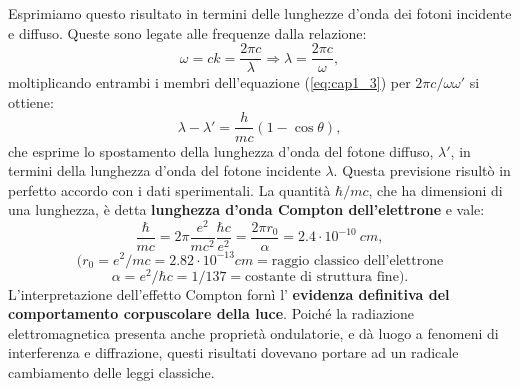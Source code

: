 \documentclass[a4paper,12pt,oneside]{book}
\begin{document}
Esprimiamo questo risultato in termini delle lunghezze d'onda dei fotoni incidente e diffuso. Queste sono legate alle frequenze dalla relazione:
\begin{equation}
\omega = c k =\frac{2 \pi c}{\lambda} \Rightarrow \lambda =\frac{2 \pi c}{\omega},
\end{equation}
moltiplicando entrambi i membri dell'equazione (\ref{eq:cap1_3}) per $2 \pi c / \omega \omega '$ si ottiene:
\begin{equation}
\lambda - \lambda ' =\frac{h}{mc}\left( 1-\cos \theta \right),
\end{equation}
che esprime lo spostamento della lunghezza d'onda del fotone diffuso, $\lambda ' $, in termini della lunghezza d'onda del fotone incidente $\lambda$. Questa previsione risultò in perfetto accordo con i dati sperimentali.
La quantità $\hbar/ mc$, che ha dimensioni di una lunghezza, è detta \textbf{lunghezza d'onda Compton dell'elettrone} e vale:
\[
\frac{\hbar}{mc}= 2\pi \frac{e^2}{mc^2}\frac{\hbar c}{e^2}= \frac{2\pi r_0}{\alpha}= 2.4 \cdot 10^{-10} \ cm,
\]
\[(r_0 = e^2/mc = 2.82 \cdot 10^{-13} cm = \textrm{raggio classico dell'elettrone}\]
\[\alpha = e^2/\hbar c = 1/137 = \textrm{costante di struttura fine}).\]
L'interpretazione dell'effetto Compton fornì l' \textbf{evidenza definitiva del comportamento corpuscolare della luce}. Poiché la radiazione elettromagnetica presenta anche proprietà ondulatorie, e dà luogo a fenomeni di interferenza e diffrazione, questi risultati dovevano portare ad un radicale cambiamento delle leggi classiche.
\end{document}
